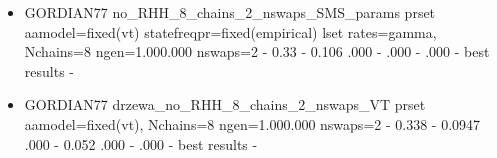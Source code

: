 \begin{itemize}
    \item GORDIAN77 \newline
no\_RHH\_8\_chains\_2\_nswaps\_SMS\_params \newline
prset aamodel=fixed(vt) statefreqpr=fixed(empirical) \newline
lset rates=gamma, Nchains=8 ngen=1.000.000 nswaps=2  - 0.33  - 0.106 .000 - .000 - .000 - \newline
best results -


    \item GORDIAN77 \newline
drzewa\_no\_RHH\_8\_chains\_2\_nswaps\_VT \newline
prset aamodel=fixed(vt), Nchains=8 ngen=1.000.000 nswaps=2  - 0.338  - 0.0947 .000 - 0.052 .000 - .000 - \newline
best results -
\end{itemize}